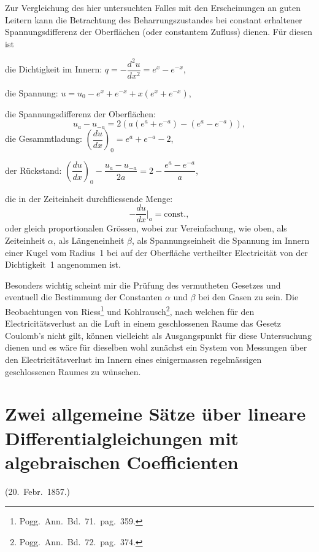 \documentclass[12pt,a4paper]{article}
\begin{document}
Zur Vergleichung des hier untersuchten Falles mit den Erscheinungen an guten Leitern kann die Betrachtung des Beharrungszustandes bei constant erhaltener Spannungsdifferenz der Oberfl\"achen (oder constantem Zufluss) dienen. F\"ur diesen ist

die Dichtigkeit im Innern: $q = -\dfrac{d^2u}{dx^2} = e^x - e^{-x}$,

die Spannung: $u = u_0 - e^x + e^{-x} + x(e^x + e^{-x})$,

die Spannungsdifferenz der Oberfl\"achen:
\[
u_a - u_{-a} = 2\left(a(e^a + e^{-a}) - (e^a - e^{-a})\right),
\]
die Gesammtladung: $\left(\dfrac{du}{dx}\right)_{\!0} = e^a + e^{-a} - 2$,

der R\"uckstand: $\left(\dfrac{du}{dx}\right)_{\!0} - \dfrac{u_a - u_{-a}}{2a} = 2 - \dfrac{e^a - e^{-a}}{a}$,

die in der Zeiteinheit durchfliessende Menge:
\[
-\frac{du}{dx}\bigg|_{a} = \text{const.},
\]
oder gleich proportionalen Gr\"ossen, wobei zur Vereinfachung, wie oben, als Zeiteinheit $\alpha$, als L\"angeneinheit $\beta$, als Spannungseinheit die Spannung im Innern einer Kugel vom Radius~1 bei auf der Oberfl\"ache vertheilter Electricit\"at von der Dichtigkeit~1 angenommen ist.

Besonders wichtig scheint mir die Pr\"ufung des vermutheten Gesetzes und eventuell die Bestimmung der Constanten $\alpha$ und $\beta$ bei den Gasen zu sein. Die Beobachtungen von Riess\footnote{Pogg.\ Ann.\ Bd.~71.\ pag.~359.} und Kohlrausch\footnote{Pogg.\ Ann.\ Bd.~72.\ pag.~374.}, nach welchen f\"ur den Electricit\"atsverlust an die Luft in einem geschlossenen Raume das Gesetz Coulomb's nicht gilt, k\"onnen vielleicht als Ausgangspunkt f\"ur diese Untersuchung dienen und es w\"are f\"ur dieselben wohl zun\"achst ein System von Messungen \"uber den Electricit\"atsverlust im Innern eines einigermassen regelm\"assigen geschlossenen Raumes zu w\"unschen.

\newpage

\section{Zwei allgemeine S\"atze \"uber lineare Differentialgleichungen mit algebraischen Coefficienten}

\begin{footnotesize}
\begin{flushright}
(20.\ Febr.\ 1857.)
\end{flushright}
\end{footnotesize}
\end{document}

